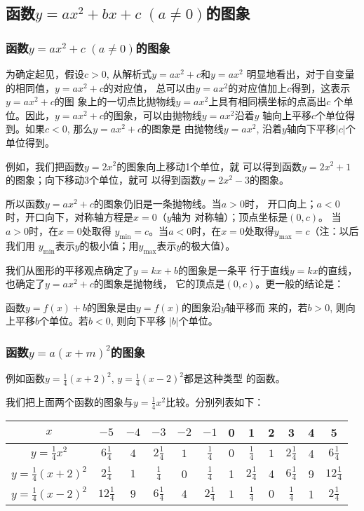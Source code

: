 \subsection{函数$y=ax^2+bx+c\; (a\ne 0)$的图象}
\subsubsection{函数$y=ax^2+c\; (a\ne 0)$的图象}
为确定起见，假设$c>0$, 从解析式$y=ax^2+c$和$y=ax^2$
明显地看出，对于自变量的相同值，$y=ax^2+c$的对应值，
总可以由$y=ax^2$的对应值加上$c$得到，这表示$y=ax^2+c$的图
象上的一切点比抛物线$y=ax^2$上具有相同横坐标的点高出$c$
个单位。因此，$y=ax^2+c$的图象，可以由抛物线$y=ax^2$沿着$y$
轴向上平移$c$个单位得到。如果$c<0$, 那么$y=ax^2+c$的图象是
由抛物线$y=ax^2$, 沿着$y$轴向下平移$|c|$个单位得到。

例如，我们把函数$y=2x^2$的图象向上移动1个单位，就
可以得到函数$y=2x^2+1$的图象；向下移动3个单位，就可
以得到函数$y=2x^2-3$的图象。

所以函数$y=ax^2+c$的图象仍旧是一条抛物线。当$a>0$时，
开口向上；$a<0$时，开口向下，对称轴方程是$x=0$（$y$轴为
对称轴）；顶点坐标是$(0,c)$。 当$a>0$时，在$x=0$处取得
$y_{\min}=c$。当$a<0$时，在$x=0$处取得$y_{\max}=c$（注：以后我们用
$y_{\min}$表示$y$的极小值；用$y_{\max}$表示$y$的极大值）。

我们从图形的平移观点确定了$y=kx+b$的图象是一条平
行于直线$y=kx$的直线，也确定了$y=ax^2+c$的图象是抛物线，
它的顶点是$(0,c)$。更一般的结论是：

函数$y=f(x)+b$的图象是由$y=f(x)$的图象沿$y$轴平移而
来的，若$b>0$, 则向上平移$b$个单位。若$b<0$, 则向下平移
$|b|$个单位。

\subsubsection{函数$y=a(x+m)^2$的图象}
例如函数$y=\frac{1}{4}(x+2)^2$, $y=\frac{1}{4}(x-2)^2$都是这种类型
的函数。

我们把上面两个函数的图象与$y=\frac{1}{4}x^2$比较。分别列表如下：
\begin{center}
\begin{tabular}{c|ccccccccccc}
\hline
    $x$ & $-5$& $-4$& $-3$& $-2$& $-1$& 0& 1& 2& 3& 4& 5\\
\hline
$y=\tfrac{1}{4}x^2$ &  $6\tfrac{1}{4}$   &  $4$  &  $2\tfrac{1}{4}$  &  $1$  &  $\tfrac{1}{4}$  &  $0$  &  $\tfrac{1}{4}$  &  $1$ & $2\tfrac{1}{4}$ &4&$6\tfrac{1}{4}$\\
$y=\tfrac{1}{4}(x+2)^2$& $2\tfrac{1}{4}$ &  $1$  &  $\tfrac{1}{4}$  & 0& $\tfrac{1}{4}$  & 1& $2\tfrac{1}{4}$ &4 &  $6\tfrac{1}{4}$  & 9& $12\tfrac{1}{4}$\\ 
$y=\tfrac{1}{4}(x-2)^2$& $12\tfrac{1}{4}$ &  $9$  &  $6\tfrac{1}{4}$  &  $4$  &  $2\tfrac{1}{4}$  &  $1$  &  $\tfrac{1}{4}$  &  $0$  &  $\tfrac{1}{4}$   &1 &  $2\tfrac{1}{4}$\\ 
\hline
\end{tabular}
\end{center}


